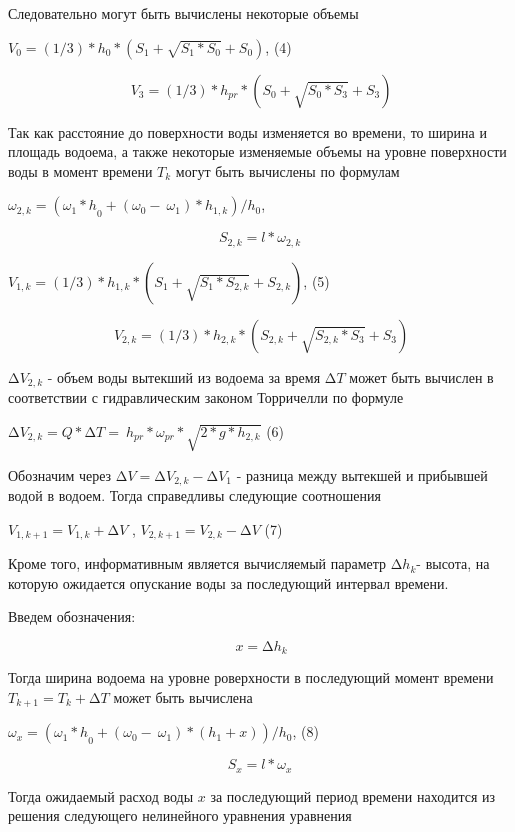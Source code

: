 \documentclass[
]{article}
\begin{document}
Следовательно могут быть вычислены некоторые объемы

\(V_{0} = (1/3)*h_{0}*\left( S_{1} + \sqrt{S_{1}*S_{0}} + S_{0} \right)\),
(4)

\[\ V_{3} = (1/3)*h_{pr}*\left( S_{0} + \sqrt{S_{0}*S_{3}} + S_{3} \right)\]

Так как расстояние до поверхности воды изменяется во времени, то ширина
и площадь водоема, а также некоторые изменяемые объемы на уровне
поверхности воды в момент времени \(T_{k}\) могут быть вычислены по
формулам

\(\omega_{2,k} = ({\omega_{1}*h}_{0} + \left( \omega_{0} - \ \omega_{1} \right)*h_{1,k})/h_{0}\),

\[S_{2,k} = l*\omega_{2,k}\]

\(V_{1,k} = (1/3)*h_{1,k}*\left( S_{1} + \sqrt{S_{1}*S_{2,k}} + S_{2,k} \right)\),
(5)

\[\ V_{2,k} = (1/3)*h_{2,k}*\left( S_{2,k} + \sqrt{S_{2,k}*S_{3}} + S_{3} \right)\]

\(\mathrm{\Delta}V_{2,k}\) - объем воды вытекший из водоема за время
\(\mathrm{\Delta}T\) может быть вычислен в соответствии с гидравлическим
законом Торричелли по формуле

\(\mathrm{\Delta}V_{2,k} = Q*\mathrm{\Delta}T = \ h_{pr}*\omega_{pr}*\sqrt{2*g*h_{2,k}}\)
(6)

Обозначим через
\(\mathrm{\Delta}V = \mathrm{\Delta}V_{2,k} - \mathrm{\Delta}V_{1}\) -
разница между вытекшей и прибывшей водой в водоем. Тогда справедливы
следующие соотношения

\(V_{1,k + 1} = V_{1,k} + \mathrm{\Delta}V\) ,
\(V_{2,k + 1} = V_{2,k} - \mathrm{\Delta}V\) (7)

Кроме того, информативным является вычисляемый параметр
\({\mathrm{\Delta}h}_{k}\)- высота, на которую ожидается опускание воды
за последующий интервал времени.

Введем обозначения:

\[\ {x = \mathrm{\Delta}h}_{k}\]

Тогда ширина водоема на уровне роверхности в последующий момент времени
\(T_{k + 1} = T_{k} + \mathrm{\Delta}T\) может быть вычислена

\(\omega_{x} = ({\omega_{1}*h}_{0} + \left( \omega_{0} - \ \omega_{1} \right)*(h_{1} + x))/h_{0}\),
(8)

\[S_{x} = l*\omega_{x}\]

Тогда ожидаемый расход воды \(x\) за последующий период времени
находится из решения следующего нелинейного уравнения уравнения
\end{document}
